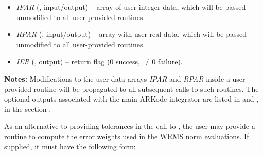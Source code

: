 \documentclass[letterpaper,10pt,english]{sphinxmanual}
\begin{document}
\begin{fulllineitems}
\begin{description}
\begin{itemize}
\item {} 
\emph{IPAR} (, input/output) -- array of user integer data, which will be passed
unmodified to all user-provided routines.

\item {} 
\emph{RPAR} (, input/output) -- array with user real data, which will be passed
unmodified to all user-provided routines.

\item {} 
\emph{IER} (, output) -- return flag (0 success, \(\ne 0\) failure).

\end{itemize}

\end{description}

\textbf{Notes:} Modifications to the user data arrays \emph{IPAR} and \emph{RPAR}
inside a user-provided routine will be propagated to all
subsequent calls to such routines. The optional outputs
associated with the main ARKode integrator are listed in
{\hyperref[f_interface/Optional_output:finterface-iouttable]{\emph{}}} and {\hyperref[f_interface/Optional_output:finterface-routtable]{\emph{}}}, in
the section {\hyperref[f_interface/Optional_output:finterface-optionaloutputs]{\emph{}}}.

\end{fulllineitems}


As an alternative to providing tolerances in the call to
{\hyperref[f_interface/Usage:f/_/FARKMALLOC]{\emph{}}}, the user may provide a routine to compute the
error weights used in the WRMS norm evaluations.  If supplied, it must
have the following form:
\end{document}
